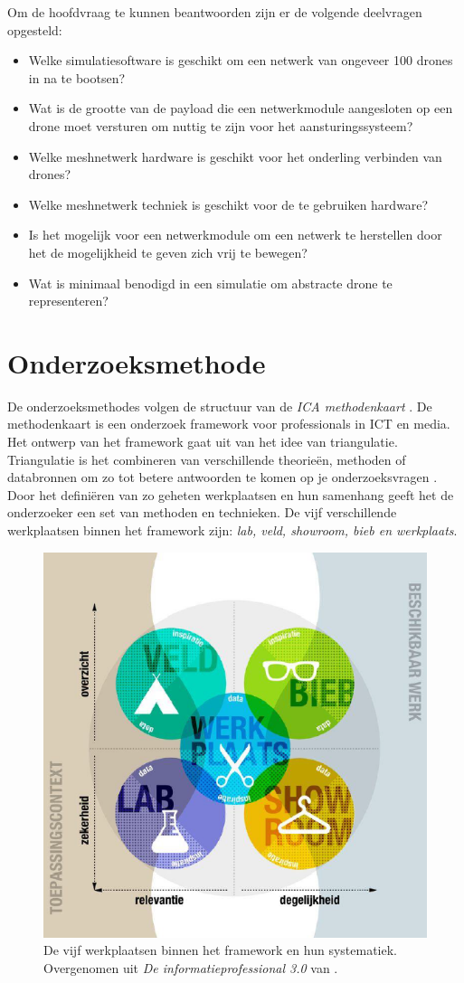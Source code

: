 \documentclass[a4paper, 11pt, oneside]{report}
\begin{document}
Om de hoofdvraag te kunnen beantwoorden zijn er de volgende deelvragen opgesteld:

\begin{itemize}
	\item Welke simulatiesoftware is geschikt om een netwerk van ongeveer 100 drones in na te bootsen?
	\item Wat is de grootte van de payload die een netwerkmodule aangesloten op een drone moet versturen om nuttig te zijn voor het aansturingssysteem?
	\item Welke meshnetwerk hardware is geschikt voor het onderling verbinden van drones?
	\item Welke meshnetwerk techniek is geschikt voor de te gebruiken hardware?
	\item Is het mogelijk voor een netwerkmodule om een netwerk te herstellen door het de mogelijkheid te geven zich vrij te bewegen?
	\item Wat is minimaal benodigd in een simulatie om abstracte drone te representeren?
\end{itemize}

\section{Onderzoeksmethode}
De onderzoeksmethodes volgen de structuur van de \textit{ICA methodenkaart} \cite{MethodenKaart}.
De methodenkaart is een onderzoek framework voor professionals in ICT en media.
Het ontwerp van het framework gaat uit van het idee van triangulatie.
Triangulatie is het combineren van verschillende theorieën, methoden of databronnen om zo tot betere antwoorden te komen op je onderzoeksvragen \cite{ICAoates}. 
Door het definiëren van zo geheten werkplaatsen en hun samenhang geeft het de onderzoeker een set van methoden en technieken. 
De vijf verschillende werkplaatsen binnen het framework zijn: \textit{lab, veld, showroom, bieb en werkplaats}.

\begin{figure}[H]
	\begin{center}\includegraphics[width=0.5\linewidth]{Methodenkaart}\end{center}
	\caption{De vijf werkplaatsen binnen het framework en hun systematiek. Overgenomen uit \textit{De informatieprofessional 3.0}  van \protect{}.}
	\label{fig:methodenkaart}
\end{figure}
\end{document}
